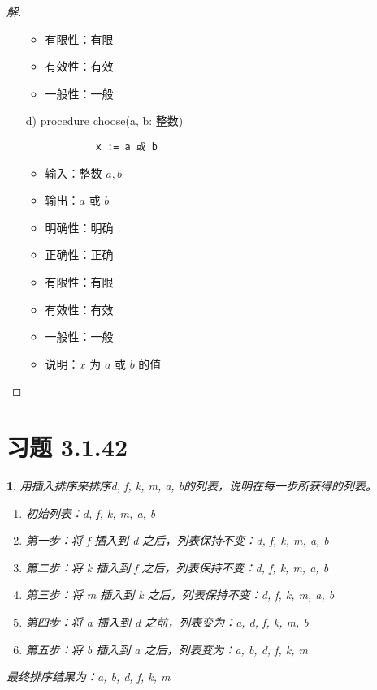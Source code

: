 \documentclass[UTF8]{report}
\theoremstyle{MyLineTheoremStyle} %
\theoremstyle{MyBlockTheoremStyle} %
\theoremstyle{MySubsubsectionStyle} %
\newtheorem{definition}{}
\begin{document}
\begin{proof}[解]
\begin{itemize}
\begin{itemize}
            \item 有限性：有限
            \item 有效性：有效
            \item 一般性：一般
        \end{itemize}
        \item[d)] procedure choose(a, b: 整数)
        \begin{verbatim}
            x := a 或 b
        \end{verbatim}
        \begin{itemize}
            \item 输入：整数 $a, b$
            \item 输出：$a$ 或 $b$
            \item 明确性：明确
            \item 正确性：正确
            \item 有限性：有限
            \item 有效性：有效
            \item 一般性：一般
            \item 说明：$x$ 为 $a$ 或 $b$ 的值
        \end{itemize}
    \end{itemize}
\end{proof}

\section{习题 3.1.42}

\begin{definition}
    用插入排序来排序d, f, k, m, a, b的列表，说明在每一步所获得的列表。
\begin{enumerate}
    \item 初始列表：d, f, k, m, a, b
    \item 第一步：将 f 插入到 d 之后，列表保持不变：d, f, k, m, a, b
    \item 第二步：将 k 插入到 f 之后，列表保持不变：d, f, k, m, a, b
    \item 第三步：将 m 插入到 k 之后，列表保持不变：d, f, k, m, a, b
    \item 第四步：将 a 插入到 d 之前，列表变为：a, d, f, k, m, b
    \item 第五步：将 b 插入到 a 之后，列表变为：a, b, d, f, k, m
\end{enumerate}

最终排序结果为：a, b, d, f, k, m
\end{definition}
\end{document}
